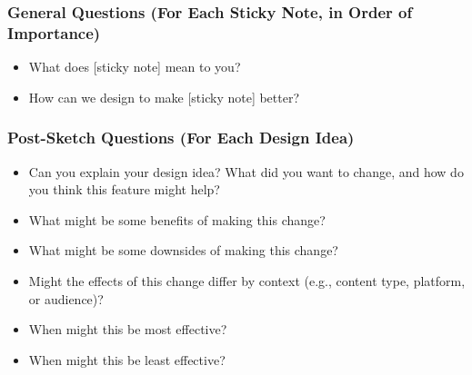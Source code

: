 \subsubsection*{General Questions (For Each Sticky Note, in Order of Importance)}

\begin{itemize}
    \item What does [sticky note] mean to you?
    \item How can we design to make [sticky note] better?
\end{itemize}

\subsubsection*{Post-Sketch Questions (For Each Design Idea)}

\begin{itemize}
    \item Can you explain your design idea? What did you want to change, and how do you think this feature might help?
    \item What might be some benefits of making this change?
    \item What might be some downsides of making this change?
    \item Might the effects of this change differ by context (e.g., content type, platform, or audience)?
    \item When might this be most effective?
    \item When might this be least effective?
\end{itemize}
